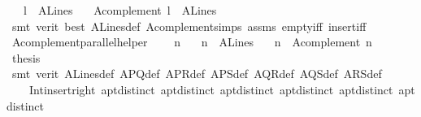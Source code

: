\begin{isabellebody}
\ \ \ {\isachardoublequoteopen}l\ {\isasymin}\ A{}Lines{\isachardoublequoteclose}\isanewline
\ \ \ {\isachardoublequoteopen}A{}complement\ l\ {\isasymin}\ A{}Lines{\isachardoublequoteclose}\isanewline
%
\isadelimproof
\ \ %
\endisadelimproof
%
\isatagproof
{}\isamarkupfalse%
\ {\isacharparenleft}{\kern0pt}smt\ {\isacharparenleft}{\kern0pt}verit{\isacharcomma}{\kern0pt}\ best{\isacharparenright}{\kern0pt}\ A{}Lines{\isacharunderscore}{\kern0pt}def\ A{}complement{\isachardot}{\kern0pt}simps\ assms\ empty{\isacharunderscore}{\kern0pt}iff\ insert{\isacharunderscore}{\kern0pt}iff{\isacharparenright}{\kern0pt}%
\endisatagproof
{\isafoldproof}%
%
\isadelimproof
\isanewline
%
\endisadelimproof
\isanewline
{}\isamarkupfalse%
\ A{}complement{\isacharunderscore}{\kern0pt}parallel{\isacharunderscore}{\kern0pt}helper{\isacharcolon}{\kern0pt}\ \isanewline
\ \ \ n\isanewline
\ \ \ {\isachardoublequoteopen}n\ {\isasymin}\ A{}Lines{\isachardoublequoteclose}\isanewline
\ \ \ {\isachardoublequoteopen}n\ {\isasyminter}\ {\isacharparenleft}{\kern0pt}A{}complement\ n{\isacharparenright}{\kern0pt}\ {\isacharequal}{\kern0pt}\ {\isacharbraceleft}{\kern0pt}{\isacharbraceright}{\kern0pt}{\isachardoublequoteclose}\isanewline
%
\isadelimproof
%
\endisadelimproof
%
\isatagproof
{}\isamarkupfalse%
\ {\isacharminus}{\kern0pt}\isanewline
\ \ \isamarkupfalse%
\ {\isacharquery}{\kern0pt}thesis\ \isanewline
\ \ \ \ \isamarkupfalse%
\ {\isacharparenleft}{\kern0pt}smt\ {\isacharparenleft}{\kern0pt}verit{\isacharparenright}{\kern0pt}\ A{}Lines{\isacharunderscore}{\kern0pt}def\ A{}PQ{\isacharunderscore}{\kern0pt}def\ A{}PR{\isacharunderscore}{\kern0pt}def\ A{}PS{\isacharunderscore}{\kern0pt}def\ A{}QR{\isacharunderscore}{\kern0pt}def\ A{}QS{\isacharunderscore}{\kern0pt}def\ A{}RS{\isacharunderscore}{\kern0pt}def\ \isanewline
\ \ \ \ Int{\isacharunderscore}{\kern0pt}insert{\isacharunderscore}{\kern0pt}right\ a{}pt{\isachardot}{\kern0pt}distinct{\isacharparenleft}{\kern0pt}{}{}{\isacharparenright}{\kern0pt}\ a{}pt{\isachardot}{\kern0pt}distinct{\isacharparenleft}{\kern0pt}{}{}{\isacharparenright}{\kern0pt}\ a{}pt{\isachardot}{\kern0pt}distinct{\isacharparenleft}{\kern0pt}{}{\isacharparenright}{\kern0pt}\ a{}pt{\isachardot}{\kern0pt}distinct{\isacharparenleft}{\kern0pt}{}{\isacharparenright}{\kern0pt}\ a{}pt{\isachardot}{\kern0pt}distinct{\isacharparenleft}{\kern0pt}{}{\isacharparenright}{\kern0pt}\ a{}pt{\isachardot}{\kern0pt}distinct{\isacharparenleft}{\kern0pt}{}{\isacharparenright}{\kern0pt}\ \isanewline

\end{isabellebody}
